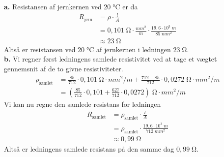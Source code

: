\documentclass{report}
\begin{document}
\textbf{a.}
Resistansen af jernkernen ved $20 \;\unit{\celsius} $ er da
\begin{equation*}
\begin{split}
  R_{\text{jern} }&=\rho \cdot \frac{l}{A}\\
  &=0,101 \;\unit{\ohm} \cdot \frac{mm^2}{m} \cdot \frac{19,6 \cdot 10^3 \;\unit{m} }{85 \;\unit{mm^2} }\\ 
  &\approx 23 \;\unit{\ohm} 
\end{split}
\end{equation*}
Altså er resistansen ved $20 \;\unit{\celsius} $ af jernkernen i ledningen $23 \;\unit{\ohm} $.\\[1ex]
\textbf{b.}
Vi regner først ledningens samlede resistivitet ved at tage et vægtet gennemsnit af de to givne resistiviteter.
\begin{equation*}
\begin{split}
  \rho_{\text{samlet}}&=\frac{85}{712} \cdot 0,101 \;\unit{\ohm \cdot mm^2/m} + \frac{712-85}{712}\cdot 0,0272 \;\unit{\ohm \cdot mm^2/m} \\ 
  &=\left(\frac{85}{712} \cdot 0,101 + \frac{627}{712} \cdot 0,0272\right) \;\unit{\ohm \cdot mm^2/m} 
\end{split}
\end{equation*}
Vi kan nu regne den samlede resistans for ledningen
\begin{equation*}
\begin{split}
  R_{\text{samlet} }&=\rho_{\text{samlet} } \cdot \frac{l}{A}\\ 
  &=\rho_{\text{samlet} } \cdot \frac{19,6 \cdot 10^3 \;\unit{m} }{712 \;\unit{mm^2} }\\ 
  &\approx 0,99 \;\unit{\ohm} 
\end{split}
\end{equation*}
Altså er ledningens samlede resistans på den samme dag $0,99 \;\unit{\ohm} $.
\end{document}
